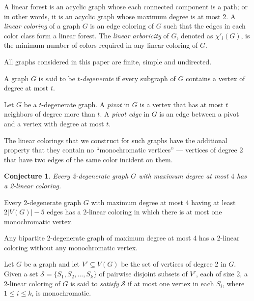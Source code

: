 
\newtheorem{conj}{Conjecture}

A linear forest is an acyclic graph whose each connected component is a path; or in other words, it is an acyclic graph whose maximum degree is at most 2. A \emph{linear coloring} of a graph $G$ is an edge coloring of $G$ such that the edges in each color class form a linear forest.
The \emph{linear arboricity} of $G$, denoted as $\chi'_l(G)$, is the minimum number of colors required in any linear coloring of $G$.

All graphs considered in this paper are finite, simple and undirected.

A graph $G$ is said to be \emph{$t$-degenerate} if every subgraph of $G$ contains a vertex of degree at most $t$.

Let $G$ be a $t$-degenerate graph. A \emph{pivot} in $G$ is a vertex that has at most $t$ neighbors of degree more than $t$. A \emph{pivot edge} in $G$ is an edge between a pivot and a vertex with degree at most $t$.

The linear colorings that we construct for such graphs have the additional property that they contain no ``monochromatic vertices'' --- vertices of degree 2 that have two edges of the same color incident on them.

\begin{conj}\label{con:2-deg}
Every 2-degenerate graph $G$ with maximum degree at most $4$ has a 2-linear coloring.
\end{conj}

\begin{theorem}\label{lessequal4}
Every 2-degenerate graph $G$ with maximum degree at most 4 having at least $2|V(G)|-5$ edges has a 2-linear coloring in which there is at most one monochromatic vertex.
\end{theorem}

\begin{theorem}\label{thm:bipartite}
Any bipartite 2-degenerate graph of maximum degree at most 4 has a 2-linear coloring without any monochromatic vertex.
\end{theorem}

\begin{definition}
Let $G$ be a graph and let $V'\subseteq V(G)$ be the set of vertices of degree 2 in $G$. Given a set $\mathcal{S}=\{S_1,S_2,\ldots,S_k\}$ of pairwise disjoint subsets of $V'$, each of size 2, a 2-linear coloring of $G$ is said to \emph{satisfy} $\mathcal{S}$ if at most one vertex in each $S_i$, where $1\leq i\leq k$, is monochromatic.
\end{definition}

